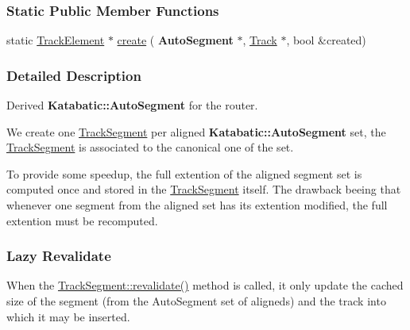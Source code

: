 \subsubsection*{Static Public Member Functions}
\begin{DoxyCompactItemize}
\item 
static \hyperlink{classKite_1_1TrackElement}{Track\+Element} $\ast$ \hyperlink{classKite_1_1TrackSegment_a536f91d468e6c2097f85169e6d790f64}{create} (\textbf{ Auto\+Segment} $\ast$, \hyperlink{classKite_1_1Track}{Track} $\ast$, bool \&created)
\end{DoxyCompactItemize}


\subsubsection{Detailed Description}
Derived \textbf{ Katabatic\+::\+Auto\+Segment} for the router. 

 We create one \hyperlink{classKite_1_1TrackSegment}{Track\+Segment} per aligned \textbf{ Katabatic\+::\+Auto\+Segment} set, the \hyperlink{classKite_1_1TrackSegment}{Track\+Segment} is associated to the canonical one of the set.

To provide some speedup, the full extention of the aligned segment set is computed once and stored in the \hyperlink{classKite_1_1TrackSegment}{Track\+Segment} itself. The drawback beeing that whenever one segment from the aligned set has it\textquotesingle{}s extention modified, the full extention must be recomputed.\hypertarget{classKite_1_1TrackSegment_secTSLazyRevalidate}{}\subsubsection{Lazy Revalidate}\label{classKite_1_1TrackSegment_secTSLazyRevalidate}
When the \hyperlink{classKite_1_1TrackSegment_a5bd93abe1416952ace15a98dbeeed124}{Track\+Segment\+::revalidate()} method is called, it only update the cached size of the segment (from the Auto\+Segment set of aligneds) and the track into which it may be inserted.

